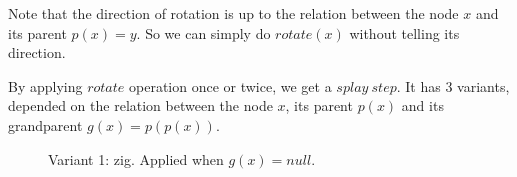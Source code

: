 \documentclass{beamer}
\theoremstyle{plain}
\begin{document}
    \begin{frame}
    
        Note that the direction of rotation is up to the relation between the node $x$ and its parent $p(x) = y$. So we can simply do $rotate(x)$ without telling its direction. \pause

        By applying $rotate$ operation once or twice, we get a $splay\ step$. It has 3 variants, depended on the relation between the node $x$, its parent $p(x)$ and its grandparent $g(x) = p(p(x))$.

        \begin{figure}
            \caption{Variant 1: zig. Applied when $g(x) = null$.}
        \end{figure}
    
    \end{frame}
\end{document}

